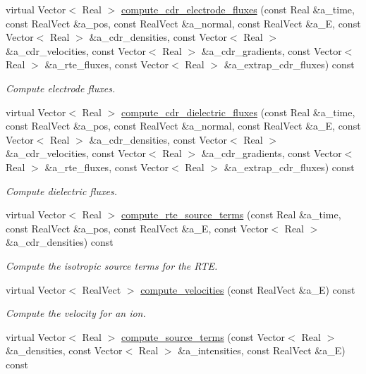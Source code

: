 \begin{DoxyCompactItemize}
virtual Vector$<$ Real $>$ \hyperlink{classair__bolsig_afe99c70d165b981a5ea05183eb296b7a}{compute\+\_\+cdr\+\_\+electrode\+\_\+fluxes} (const Real \&a\+\_\+time, const Real\+Vect \&a\+\_\+pos, const Real\+Vect \&a\+\_\+normal, const Real\+Vect \&a\+\_\+E, const Vector$<$ Real $>$ \&a\+\_\+cdr\+\_\+densities, const Vector$<$ Real $>$ \&a\+\_\+cdr\+\_\+velocities, const Vector$<$ Real $>$ \&a\+\_\+cdr\+\_\+gradients, const Vector$<$ Real $>$ \&a\+\_\+rte\+\_\+fluxes, const Vector$<$ Real $>$ \&a\+\_\+extrap\+\_\+cdr\+\_\+fluxes) const 
\begin{DoxyCompactList}\small\item\em Compute electrode fluxes. \end{DoxyCompactList}\item 
virtual Vector$<$ Real $>$ \hyperlink{classair__bolsig_a3348c560bc0ca772f141940f2610f393}{compute\+\_\+cdr\+\_\+dielectric\+\_\+fluxes} (const Real \&a\+\_\+time, const Real\+Vect \&a\+\_\+pos, const Real\+Vect \&a\+\_\+normal, const Real\+Vect \&a\+\_\+E, const Vector$<$ Real $>$ \&a\+\_\+cdr\+\_\+densities, const Vector$<$ Real $>$ \&a\+\_\+cdr\+\_\+velocities, const Vector$<$ Real $>$ \&a\+\_\+cdr\+\_\+gradients, const Vector$<$ Real $>$ \&a\+\_\+rte\+\_\+fluxes, const Vector$<$ Real $>$ \&a\+\_\+extrap\+\_\+cdr\+\_\+fluxes) const 
\begin{DoxyCompactList}\small\item\em Compute dielectric fluxes. \end{DoxyCompactList}\item 
virtual Vector$<$ Real $>$ \hyperlink{classair__bolsig_a9844ef5679bbec9955440b7b8cd54bcb}{compute\+\_\+rte\+\_\+source\+\_\+terms} (const Real \&a\+\_\+time, const Real\+Vect \&a\+\_\+pos, const Real\+Vect \&a\+\_\+E, const Vector$<$ Real $>$ \&a\+\_\+cdr\+\_\+densities) const 
\begin{DoxyCompactList}\small\item\em Compute the isotropic source terms for the R\+TE. \end{DoxyCompactList}\item 
virtual Vector$<$ Real\+Vect $>$ \hyperlink{classair__bolsig_ae49aea959c2c6de3814973c446d82335}{compute\+\_\+velocities} (const Real\+Vect \&a\+\_\+E) const 
\begin{DoxyCompactList}\small\item\em Compute the velocity for an ion. \end{DoxyCompactList}\item 
virtual Vector$<$ Real $>$ \hyperlink{classair__bolsig_a827c1038a086a364d43af5f6c90ccf15}{compute\+\_\+source\+\_\+terms} (const Vector$<$ Real $>$ \&a\+\_\+densities, const Vector$<$ Real $>$ \&a\+\_\+intensities, const Real\+Vect \&a\+\_\+E) const 

\end{DoxyCompactItemize}
